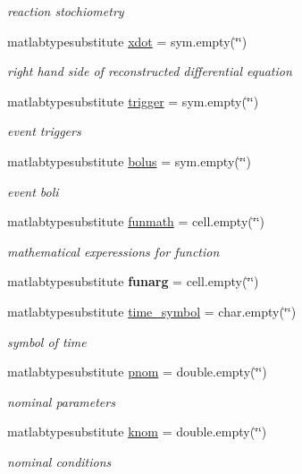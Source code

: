 \begin{DoxyCompactItemize}
\begin{DoxyCompactList}\small\item\em reaction stochiometry \end{DoxyCompactList}\item 
matlabtypesubstitute \hyperlink{class_s_b_m_lode_a914ee05b8f01d45602316710ca4b8a43}{xdot} = sym.\+empty(\char`\"{}\char`\"{})
\begin{DoxyCompactList}\small\item\em right hand side of reconstructed differential equation \end{DoxyCompactList}\item 
matlabtypesubstitute \hyperlink{class_s_b_m_lode_ae194cb817eae4085f8023885100c68dd}{trigger} = sym.\+empty(\char`\"{}\char`\"{})
\begin{DoxyCompactList}\small\item\em event triggers \end{DoxyCompactList}\item 
matlabtypesubstitute \hyperlink{class_s_b_m_lode_ab9227561ac246ee4b70f9e65c25ffda7}{bolus} = sym.\+empty(\char`\"{}\char`\"{})
\begin{DoxyCompactList}\small\item\em event boli \end{DoxyCompactList}\item 
matlabtypesubstitute \hyperlink{class_s_b_m_lode_a9c1cb6154a226c993c60010300a62e34}{funmath} = cell.\+empty(\char`\"{}\char`\"{})
\begin{DoxyCompactList}\small\item\em mathematical experessions for function \end{DoxyCompactList}\item 
\mbox{\label{class_s_b_m_lode_ae416c192e9400c4554793f3962a7c7ac}} 
matlabtypesubstitute {\bfseries funarg} = cell.\+empty(\char`\"{}\char`\"{})
\item 
matlabtypesubstitute \hyperlink{class_s_b_m_lode_ac38903669f208bc49c971c7a69f62225}{time\+\_\+symbol} = char.\+empty(\char`\"{}\char`\"{})
\begin{DoxyCompactList}\small\item\em symbol of time \end{DoxyCompactList}\item 
matlabtypesubstitute \hyperlink{class_s_b_m_lode_aab64bc684d10326610cc4e866d7ed65c}{pnom} = double.\+empty(\char`\"{}\char`\"{})
\begin{DoxyCompactList}\small\item\em nominal parameters \end{DoxyCompactList}\item 
matlabtypesubstitute \hyperlink{class_s_b_m_lode_a744d356a79732f2b65d02f220c580dd4}{knom} = double.\+empty(\char`\"{}\char`\"{})
\begin{DoxyCompactList}\small\item\em nominal conditions \end{DoxyCompactList}\end{DoxyCompactItemize}


